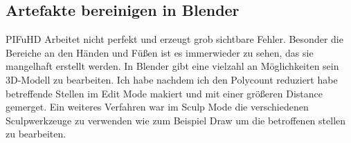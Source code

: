\subsection{Artefakte bereinigen in Blender}%
PIFuHD Arbeitet nicht perfekt und erzeugt grob sichtbare Fehler. Besonder die Bereiche an den Händen und Füßen ist es immerwieder zu sehen, das sie mangelhaft erstellt werden. In Blender gibt eine vielzahl an Möglichkeiten sein 3D-Modell zu bearbeiten. Ich habe nachdem ich den Polycount reduziert habe betreffende Stellen im Edit Mode makiert und mit einer größeren Distance gemerget. Ein weiteres Verfahren war im Sculp Mode die verschiedenen Sculpwerkzeuge zu verwenden wie zum Beispiel Draw um die betroffenen stellen zu bearbeiten.
